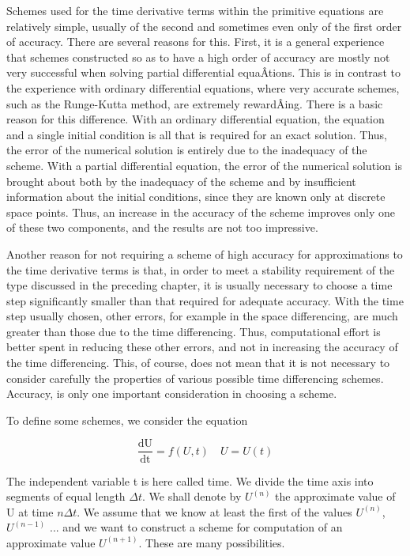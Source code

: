 Schemes used for the time derivative terms within the primitive
equations are relatively simple, usually of the second and sometimes
even only of the first order of accuracy. There are several reasons for
this. First, it is a\textquotesingle{} general experience that schemes
constructed so as to have a high order of accuracy are mostly not very
successful when solving partial differential equaÂ­tions. This is in
contrast to the experience with ordinary differential equations, where
very accurate schemes, such as the Runge-Kutta method, are extremely
rewardÂ­ing. There is a basic reason for this difference. With an
ordinary differential equation, the equation and a single initial
condition is all that is required for an exact solution. Thus, the error
of the numerical solution is entirely due to the inadequacy of the
scheme. With a partial differential equation, the error of the numerical
solution is brought about both by the inadequacy of the scheme and by
insufficient information about the initial conditions, since they are
known only at discrete space points. Thus, an increase in the accuracy
of the scheme improves only one of these two components, and the results
are not too impressive.

Another reason for not requiring a scheme of high accuracy for
approximations to the time derivative terms is that, in order to meet a
stability requirement of the type discussed in the preceding chapter, it
is usually necessary to choose a time step significantly smaller than
that required for adequate accuracy. With the time step usually chosen,
other errors, for example in the space differencing, are much greater
than those due to the time differencing. Thus, computational effort is
better spent in reducing these other errors, and not in increasing the
accuracy of the time differencing. This, of course, does not mean that
it is not necessary to consider carefully the properties of various
possible time differencing schemes. Accuracy, is only one important
consideration in choosing a scheme.

To define some schemes, we consider the equation

\[\frac{\text{dU}}{\text{dt}} = f( U,t) \quad  U = U(t)\]

The independent variable t is here called time. We divide the time axis
into segments of equal length \(\Delta t\). We shall denote by
\(U^{\left( n \right)}\) the approximate value of U at time
\(n\Delta t\). We assume that we know at least the first of the values
\(U^{\left( n \right)}\), \(U^{\left( n - 1 \right)}\) ... and we want
to construct a scheme for computation of an approximate value
\(U^{\left( n + 1 \right)}\). These are many possibilities.

